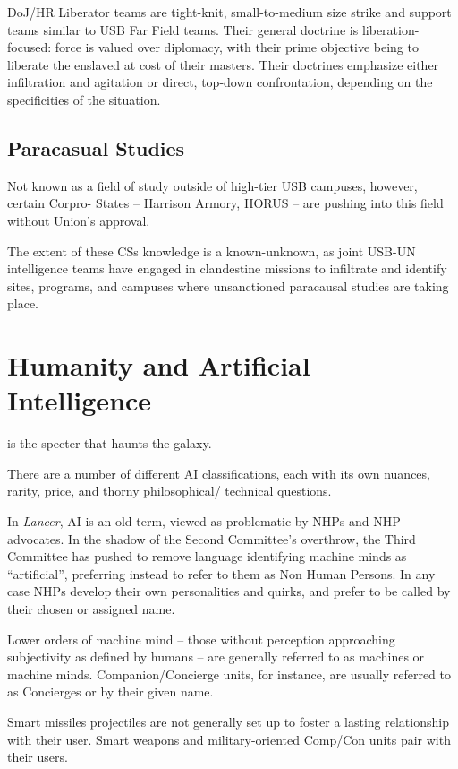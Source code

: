 DoJ/HR Liberator teams are tight-knit, small-to-medium size strike and support teams similar to
USB Far Field teams. Their general doctrine is liberation-focused: force is valued over diplomacy,
with their prime objective being to liberate the enslaved at cost of their masters. Their doctrines
emphasize either infiltration and agitation or direct, top-down confrontation, depending on the
specificities of the situation.

\subsection{Paracasual Studies}

Not known as a field of study outside of high-tier USB campuses, however, certain Corpro-
States -- Harrison Armory, HORUS -- are pushing into this field without Union's approval.

The extent of these CSs knowledge is a known-unknown, as joint USB-UN intelligence teams
have engaged in clandestine missions to infiltrate and identify sites, programs, and campuses
where unsanctioned paracausal studies are taking place.

\section{Humanity and Artificial Intelligence}

 is the specter that haunts the galaxy.

There are a number of different AI classifications, each with its own nuances, rarity, price, and
thorny philosophical/ technical questions.

In \textit{Lancer}, AI is an old term, viewed as problematic by NHPs and NHP advocates. In the shadow
of the Second Committee's overthrow, the Third Committee has pushed to remove language
identifying machine minds as ``artificial'', preferring instead to refer to them as Non Human
Persons. In any case NHPs develop their own personalities and quirks, and prefer to be called by
their chosen or assigned name.

Lower orders of machine mind -- those without perception approaching subjectivity as defined
by humans -- are generally referred to as machines or machine minds. Companion/Concierge
units, for instance, are usually referred to as Concierges or by their given name.

Smart missiles projectiles are not generally set up to foster a lasting relationship with their user.
Smart weapons and military-oriented Comp/Con units pair with their users.


